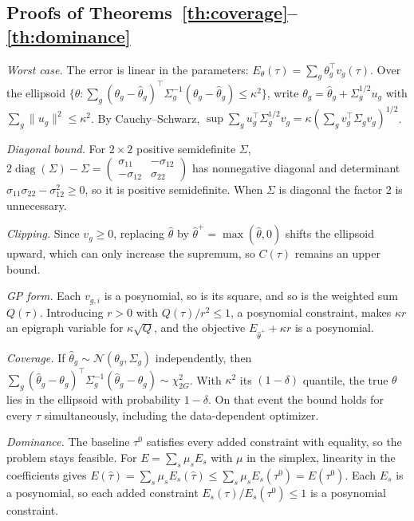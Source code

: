 \documentclass[10pt,letterpaper,journal]{IEEEtran}
\begin{document}
\subsection{Proofs of Theorems~\ref{th:coverage}--\ref{th:dominance}}
\emph{Worst case.} The error is linear in the parameters: $E_\theta(\tau)=\sum_g\theta_g^\top v_g(\tau)$. Over the ellipsoid $\{\theta:\sum_g(\theta_g-\hat\theta_g)^\top\Sigma_g^{-1}(\theta_g-\hat\theta_g)\le\kappa^2\}$, write $\theta_g=\hat\theta_g+\Sigma_g^{1/2}u_g$ with $\sum_g\|u_g\|^2\le\kappa^2$. By Cauchy--Schwarz, $\sup\sum_gu_g^\top\Sigma_g^{1/2}v_g=\kappa(\sum_gv_g^\top\Sigma_gv_g)^{1/2}$.

\emph{Diagonal bound.} For $2\times2$ positive semidefinite $\Sigma$, $2\operatorname{diag}(\Sigma)-\Sigma=\begin{pmatrix}\sigma_{11}&-\sigma_{12}\\-\sigma_{12}&\sigma_{22}\end{pmatrix}$ has nonnegative diagonal and determinant $\sigma_{11}\sigma_{22}-\sigma_{12}^2\ge0$, so it is positive semidefinite. When $\Sigma$ is diagonal the factor 2 is unnecessary.

\emph{Clipping.} Since $v_g\ge0$, replacing $\hat\theta$ by $\hat\theta^+=\max(\hat\theta,0)$ shifts the ellipsoid upward, which can only increase the supremum, so $C(\tau)$ remains an upper bound.

\emph{GP form.} Each $v_{g,i}$ is a posynomial, so is its square, and so is the weighted sum $Q(\tau)$. Introducing $r>0$ with $Q(\tau)/r^2\le1$, a posynomial constraint, makes $\kappa r$ an epigraph variable for $\kappa\sqrt{Q}$, and the objective $E_{\hat\theta^+}+\kappa r$ is a posynomial.

\emph{Coverage.} If $\hat\theta_g\sim\mathcal N(\theta_g,\Sigma_g)$ independently, then $\sum_g(\hat\theta_g-\theta_g)^\top\Sigma_g^{-1}(\hat\theta_g-\theta_g)\sim\chi^2_{2G}$. With $\kappa^2$ its $(1-\delta)$ quantile, the true $\theta$ lies in the ellipsoid with probability $1-\delta$. On that event the bound holds for every $\tau$ simultaneously, including the data-dependent optimizer.

\emph{Dominance.} The baseline $\tau^0$ satisfies every added constraint with equality, so the problem stays feasible. For $E=\sum_s\mu_sE_s$ with $\mu$ in the simplex, linearity in the coefficients gives $E(\hat\tau)=\sum_s\mu_sE_s(\hat\tau)\le\sum_s\mu_sE_s(\tau^0)=E(\tau^0)$. Each $E_s$ is a posynomial, so each added constraint $E_s(\tau)/E_s(\tau^0)\le1$ is a posynomial constraint.
\end{document}
